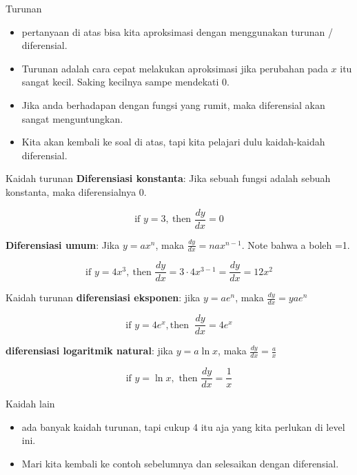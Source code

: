 \documentclass[
  ignorenonframetext,
]{beamer}
\begin{document}
\begin{frame}{Turunan}
\label{turunan}
\begin{itemize}
\item
  pertanyaan di atas bisa kita aproksimasi dengan menggunakan turunan /
  diferensial.
\item
  Turunan adalah cara cepat melakukan aproksimasi jika perubahan pada
  \(x\) itu sangat kecil. Saking kecilnya sampe mendekati 0.
\item
  Jika anda berhadapan dengan fungsi yang rumit, maka diferensial akan
  sangat menguntungkan.
\item
  Kita akan kembali ke soal di atas, tapi kita pelajari dulu
  kaidah-kaidah diferensial.
\end{itemize}
\end{frame}

\begin{frame}{Kaidah turunan}
\label{kaidah-turunan}
\textbf{Diferensiasi konstanta}: Jika sebuah fungsi adalah sebuah
konstanta, maka diferensialnya 0.

\[
\text{if }y=3, \ \text{then } \frac{dy}{dx}=0
\]

\textbf{Diferensiasi umum}: Jika \(y=ax^n\), maka
\(\frac{dy}{dx}=nax^{n-1}\). Note bahwa a boleh =1.

\[
\text{if }y=4x^3, \ \text{then } \frac{dy}{dx}=3\cdot 4x^{3-1}=\frac{dy}{dx}=12x^2
\]
\end{frame}

\begin{frame}{Kaidah turunan}
\label{kaidah-turunan-1}
\textbf{diferensiasi eksponen}: jika \(y=ae^n\), maka
\(\frac{dy}{dx}=yae^n\)

\[
\text{if } y=4e^x, \text{then } \ \frac{dy}{dx}=4e^x
\]

\textbf{diferensiasi logaritmik natural}: jika \(y=a \ln x\), maka
\(\frac{dy}{dx}=\frac{a}{x}\)

\[
\text{if }y= \ln x, \text{ then } \frac{dy}{dx}=\frac{1}{x}
\]
\end{frame}

\begin{frame}{Kaidah lain}
\label{kaidah-lain}
\begin{itemize}
\item
  ada banyak kaidah turunan, tapi cukup 4 itu aja yang kita perlukan di
  level ini.
\item
  Mari kita kembali ke contoh sebelumnya dan selesaikan dengan
  diferensial.
\end{itemize}
\end{frame}
\end{document}
